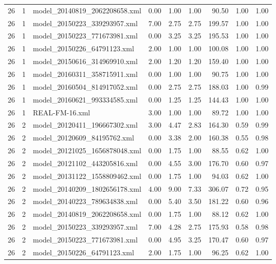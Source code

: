 \begin{table}[ht]
\begin{tabular}{rrlrrrrrr}
   26 &   1 & model\_20140819\_2062208658.xml & 0.00 & 1.00 & 1.00 & 90.50 & 1.00 & 1.00 \\ 
   26 &   1 & model\_20150223\_339293957.xml & 7.00 & 2.75 & 2.75 & 199.57 & 1.00 & 1.00 \\ 
   26 &   1 & model\_20150223\_771673981.xml & 0.00 & 3.25 & 3.25 & 195.53 & 1.00 & 1.00 \\ 
   26 &   1 & model\_20150226\_64791123.xml & 2.00 & 1.00 & 1.00 & 100.08 & 1.00 & 1.00 \\ 
   26 &   1 & model\_20150616\_314969910.xml & 2.00 & 1.20 & 1.20 & 159.40 & 1.00 & 1.00 \\ 
   26 &   1 & model\_20160311\_358715911.xml & 0.00 & 1.00 & 1.00 & 90.75 & 1.00 & 1.00 \\ 
   26 &   1 & model\_20160504\_814917052.xml & 0.00 & 2.75 & 2.75 & 188.03 & 1.00 & 0.99 \\ 
   26 &   1 & model\_20160621\_993334585.xml & 0.00 & 1.25 & 1.25 & 144.43 & 1.00 & 1.00 \\ 
   26 &   1 & REAL-FM-16.xml & 3.00 & 1.00 & 1.00 & 89.72 & 1.00 & 1.00 \\ 
   26 &   2 & model\_20120411\_196667302.xml & 3.00 & 4.47 & 2.83 & 164.30 & 0.59 & 0.99 \\ 
   26 &   2 & model\_20120609\_84195762.xml & 0.00 & 3.38 & 2.00 & 160.38 & 0.55 & 0.98 \\ 
   26 &   2 & model\_20121025\_1656878048.xml & 0.00 & 1.75 & 1.00 & 88.55 & 0.62 & 1.00 \\ 
   26 &   2 & model\_20121102\_443205816.xml & 0.00 & 4.55 & 3.00 & 176.70 & 0.60 & 0.97 \\ 
   26 &   2 & model\_20131122\_1558809462.xml & 0.00 & 1.75 & 1.00 & 94.03 & 0.62 & 1.00 \\ 
   26 &   2 & model\_20140209\_1802656178.xml & 4.00 & 9.00 & 7.33 & 306.07 & 0.72 & 0.95 \\ 
   26 &   2 & model\_20140223\_789634838.xml & 0.00 & 5.40 & 3.50 & 181.22 & 0.60 & 0.96 \\ 
   26 &   2 & model\_20140819\_2062208658.xml & 0.00 & 1.75 & 1.00 & 88.12 & 0.62 & 1.00 \\ 
   26 &   2 & model\_20150223\_339293957.xml & 7.00 & 4.28 & 2.75 & 175.93 & 0.58 & 0.98 \\ 
   26 &   2 & model\_20150223\_771673981.xml & 0.00 & 4.95 & 3.25 & 170.47 & 0.60 & 0.97 \\ 
   26 &   2 & model\_20150226\_64791123.xml & 2.00 & 1.75 & 1.00 & 96.25 & 0.62 & 1.00 \\ 

\end{tabular}
\end{table}
